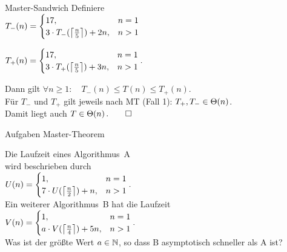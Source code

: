 \begin{frame}{Master-Sandwich}
	\solutionheading 
	 Definiere\\ \begin{math}
		T_-(n) = 
		\begin{cases}
		17,                           			   &n = 1 \\
		3 \cdot T_-(\left\lceil\frac{n}{5}\right\rceil) + 2n,  &  n > 1
		\end{cases}
		\end{math}
		
		\begin{math}
		T_+(n) = 
		\begin{cases}
		17,                           			   &n = 1 \\
		3 \cdot T_+(\left\lceil\frac{n}{5}\right\rceil) + 3n ,  &  n > 1
		\end{cases}.
		\end{math}
		
		\medskip
		Dann gilt $\forall n \geq 1: \quad T_-(n) \leq T(n) \leq T_+(n)$.\\
		Für $T_-$ und $T_+$ gilt jeweils nach MT (Fall 1): $ T_+, T_- \in \Theta\!\left(n\right)$.\\
		Damit liegt auch $T \in \Theta\!\left(n\right). \qed$
		
\end{frame}

\begin{frame}{Aufgaben Master-Theorem}
	\begin{wrapfigure}{r}[-.2\baselineskip]{.38\textwidth}
		\fbox{\mastertheoreminder}
	\end{wrapfigure}
	Die Laufzeit eines Algorithmus~A \\
	wird beschrieben durch \\ \smallskip
	\begin{math}
	U(n) = 
	\begin{cases}
	1,                           			   &n = 1 \\
	7 \cdot U(\left\lceil\frac{n}{2}\right\rceil) + n,  &  n > 1
	\end{cases}.
	\end{math} \\ \bigskip
	Ein weiterer Algorithmus~B hat die Laufzeit \\ \smallskip
	\begin{math}
	V(n) = 
	\begin{cases}
	1,                            				& n = 1 \\
	a \cdot V(\left\lceil\frac{n}{4}\right\rceil) + 5n,  & n > 1
	\end{cases}.
	\end{math} \\ \bigskip
	Was ist der größte Wert $a \in \mathbb{N}$, so dass B asymptotisch schneller als A ist?
\end{frame}

